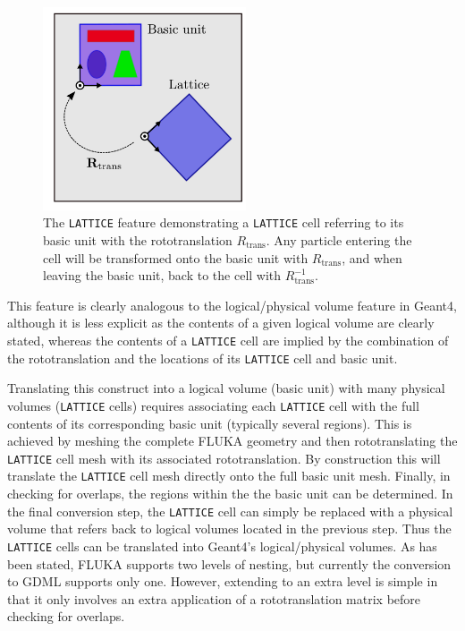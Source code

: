 \documentclass[final,5p,times,twocolumn]{elsarticle}
\newcommand{\fluka}[1]{\texttt{\MakeUppercase{#1}}}
\begin{document}
\begin{figure}[hbtp]
\begin{center}
\includegraphics[width=6cm]{./diagrams/lattice}
\caption{The \fluka{lattice} feature demonstrating a \fluka{lattice} cell
  referring to its basic unit with the rototranslation $R_\textrm{trans}$.
  Any particle entering the cell will be transformed onto the basic unit
  with $R_\textrm{trans}$, and when leaving the basic unit, back to the cell
  with $R_\textrm{trans}^{-1}$.}
\label{fig:lattice}
\end{center}
\end{figure}

This feature is clearly analogous to the logical/physical volume feature in
Geant4, although it is less explicit as the contents of a given logical
volume are clearly stated, whereas the contents of a \fluka{lattice} cell
are implied by the combination of the rototranslation and the locations of
its \fluka{lattice} cell and basic unit.

Translating this construct into a logical volume (basic unit) with many
physical volumes (\fluka{lattice} cells) requires associating each
\fluka{lattice} cell with the full contents of its corresponding basic unit
(typically several regions). This is achieved by meshing the complete
FLUKA geometry and then rototranslating the \fluka{lattice} cell mesh with
its associated rototranslation. By construction this will translate the
\fluka{lattice} cell mesh directly onto the full basic unit mesh. Finally,
in checking for overlaps, the regions within the the basic unit can be
determined. In the final conversion step, the \fluka{lattice} cell can
simply be replaced with a physical volume that refers back to logical
volumes located in the previous step. Thus the \fluka{lattice} cells can
be translated into Geant4's logical/physical volumes. As has been stated,
FLUKA supports two levels of nesting, but currently the conversion to GDML
supports only one. However, extending to an extra level is simple in that
it only involves an extra application of a rototranslation matrix before
checking for overlaps.
\end{document}
